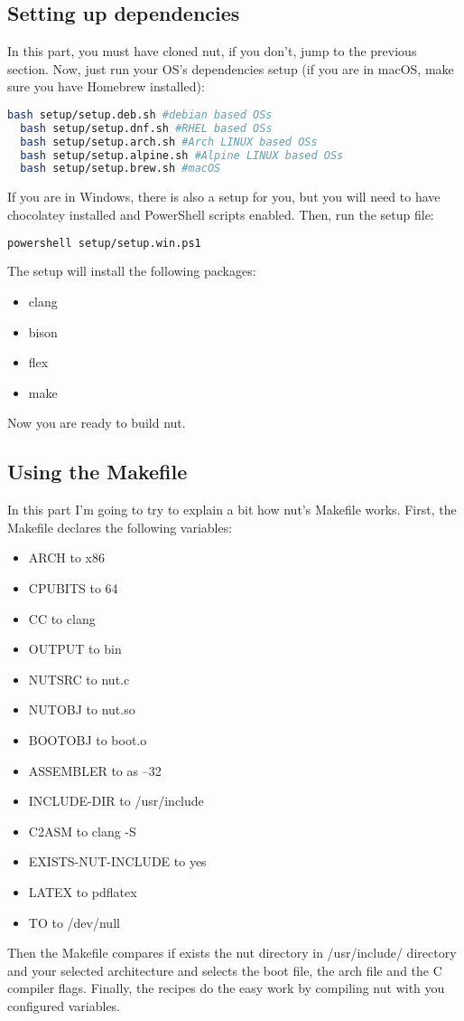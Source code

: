 \documentclass{article}
\begin{document}
  \subsection{Setting up dependencies}
  In this part, you must have cloned nut, if you don't, jump to the previous section. Now, just run your OS's dependencies setup (if you are in macOS, make sure you have Homebrew installed):
  \begin{lstlisting}[language=bash]
  bash setup/setup.deb.sh #debian based OSs
  bash setup/setup.dnf.sh #RHEL based OSs
  bash setup/setup.arch.sh #Arch LINUX based OSs
  bash setup/setup.alpine.sh #Alpine LINUX based OSs
  bash setup/setup.brew.sh #macOS\end{lstlisting}
  If you are in Windows, there is also a setup for you, but you will need to have chocolatey installed and PowerShell scripts enabled. Then, run the setup file:
  \begin{lstlisting}[language=bash]
  powershell setup/setup.win.ps1\end{lstlisting}
  The setup will install the following packages:
  \begin{itemize}
  	\item clang
  	\item bison
  	\item flex
  	\item make
  \end{itemize}
  Now you are ready to build nut.
  \\
  \subsection{Using the Makefile}
  In this part I'm going to try to explain a bit how nut's Makefile works. First, the Makefile declares the following variables:
  \begin{itemize}
  	\item ARCH to x86
  	\item CPUBITS to 64
  	\item CC to clang
  	\item OUTPUT to bin
  	\item NUTSRC to nut.c
  	\item NUTOBJ to nut.so
  	\item BOOTOBJ to boot.o
  	\item ASSEMBLER to as --32
  	\item INCLUDE-DIR to /usr/include
  	\item C2ASM to clang -S
  	\item EXISTS-NUT-INCLUDE to yes
  	\item LATEX to pdflatex
  	\item TO to /dev/null
  \end{itemize}
  Then the Makefile compares if exists the nut directory in /usr/include/ directory and your selected architecture and selects the boot file, the arch file and the C compiler flags. Finally, the recipes do the easy work by compiling nut with you configured variables.
  \\
\end{document}
